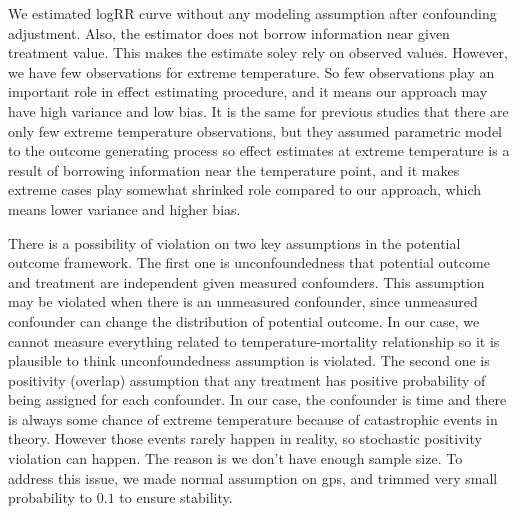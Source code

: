 \documentclass[12pt]{article}
\begin{document}
We estimated logRR curve without any modeling assumption after confounding adjustment.
Also, the estimator does not borrow information near given treatment value.
This makes the estimate soley rely on observed values.
However, we have few observations for extreme temperature.
So few observations play an important role in effect estimating procedure,
and it means our approach may have high variance and low bias.
It is the same for previous studies that there are only few extreme temperature observations,
but they assumed parametric model to the outcome generating process
so effect estimates at extreme temperature is a result of borrowing information near the temperature point,
and it makes extreme cases play somewhat shrinked role compared to our approach,
which means lower variance and higher bias.

There is a possibility of violation on two key assumptions in the potential outcome framework.
The first one is unconfoundedness
that potential outcome and treatment are independent given measured confounders.
This assumption may be violated when there is an unmeasured confounder,
since unmeasured confounder can change the distribution of potential outcome.
In our case, we cannot measure everything related to temperature-mortality relationship
so it is plausible to think unconfoundedness assumption is violated.
The second one is positivity (overlap) assumption
that any treatment has positive probability of being assigned for each confounder.
In our case, the confounder is time and 
there is always some chance of extreme temperature because of catastrophic events in theory.
However those events rarely happen in reality, 
so stochastic positivity violation\cite{zivich2022} can happen.
The reason is we don't have enough sample size.
To address this issue, we made normal assumption on gps,
and trimmed very small probability to $0.1$ to ensure stability.


{}

\end{document}
